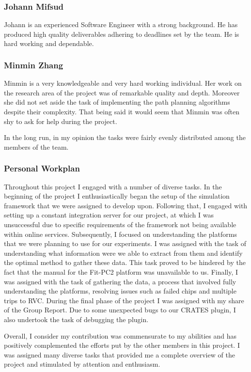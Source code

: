 \subsubsection{Johann Mifsud}
Johann is an experienced Software Engineer with a strong background. He
has produced high quality deliverables adhering to deadlines set by the team.
He is hard working and dependable.

\subsubsection{Minmin Zhang}
Minmin is a very knowledgeable and very hard working individual. Her work on the
research area of the project was of remarkable quality and depth. Moreover she
did not set aside the task of implementing the path planning algorithms despite
their complexity. That being said it would seem that Minmin was often shy to
ask for help during the project.

In the long run, in my opinion the tasks were fairly evenly distributed among
the members of the team.

\subsubsection{Personal Workplan}
Throughout this project I engaged with a number of diverse tasks. In the
beginning of the project I enthusiastically began the setup of the simulation
framework that we were assigned to develop upon. Following that, I engaged with
setting up a constant integration server for our project, at which I was
unsuccessful due to specific requirements of the framework not being available
within online services. Subsequently, I focused on understanding the platforms
that we were planning to use for our experiments. I was assigned with the task
of understanding what information were we able to extract from them and identify
the optimal method to gather these data. This task proved to be hindered by the
fact that the manual for the Fit-PC2 platform was unavailable to us. Finally, I
was assigned with the task of gathering the data, a process that involved fully
understanding the platforms, resolving issues such as failed chips and multiple
trips to RVC. During the final phase of the project I was assigned with my share
of the Group Report. Due to some unexpected bugs to our CRATES plugin, I also
undertook the task of debugging the plugin.

Overall, I consider my contribution was commensurate to my abilities and has
positively complemented the efforts put by the other members in this project. I
was assigned many diverse tasks that provided me a complete overview of the
project and stimulated by attention and enthusiasm.

